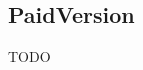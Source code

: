 \documentclass[FIPLY_base.tex]{subfiles}
\author{Gerald Irsiegler}
\date{25. Februar 2016}
\begin{document}
\subsection{PaidVersion}
TODO
\end{document}
